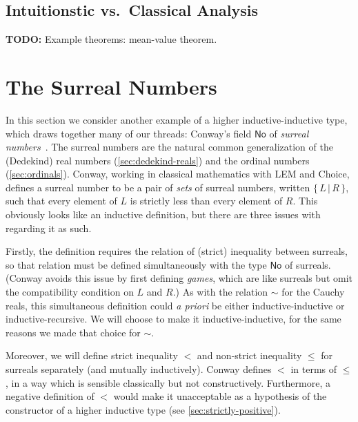 \subsection{Intuitionstic vs.\ Classical Analysis}
\label{sec:intuitionistic-vs-classical-analysis}

\textbf{TODO:} Example theorems: mean-value theorem.


\section{The Surreal Numbers}
\label{sec:surreals}

\newcommand{\NO}{\ensuremath{\mathsf{No}}\xspace}
\newcommand{\surr}[2]{\{\,#1\,\big|\,#2\,\}}
\newcommand{\LL}{\mathcal{L}}
\newcommand{\RR}{\mathcal{R}}

In this section we consider another example of a higher inductive-inductive type, which draws together many of our threads: Conway's field \NO of \emph{surreal numbers}~\cite{conway:onag}.
The surreal numbers are the natural common generalization of the (Dedekind) real numbers (\autoref{sec:dedekind-reals}) and the ordinal numbers (\autoref{sec:ordinals}).
Conway, working in classical mathematics with LEM and Choice, defines a surreal number to be a pair of \emph{sets} of surreal numbers, written $\surr L R$, such that every element of $L$ is strictly less than every element of $R$.
This obviously looks like an inductive definition, but there are three issues with regarding it as such.

Firstly, the definition requires the relation of (strict) inequality between surreals, so that relation must be defined simultaneously with the type \NO of surreals.
(Conway avoids this issue by first defining \emph{games}, which are like surreals but omit the compatibility condition on $L$ and $R$.)
As with the relation $\sim$ for the Cauchy reals, this simultaneous definition could \emph{a priori} be either inductive-inductive or inductive-recursive.
We will choose to make it inductive-inductive, for the same reasons we made that choice for $\sim$.

Moreover, we will define strict inequality $<$ and non-strict inequality $\le$ for surreals separately (and mutually inductively).
Conway defines $<$ in terms of $\le$, in a way which is sensible classically but not constructively.
Furthermore, a negative definition of $<$ would make it unacceptable as a hypothesis of the constructor of a higher inductive type (see \autoref{sec:strictly-positive}).

